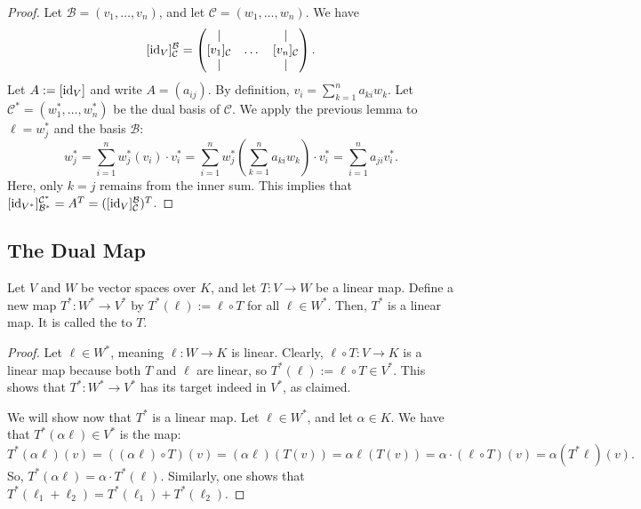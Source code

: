 \begin{proof}
  Let $\mathcal{B} = (v_1, \dots, v_n)$, and let $\mathcal{C} = (w_1, \dots, w_n)$. We have 
  \[[\operatorname{id}_V]_{\mathcal{C}}^{\mathcal{B}} = \begin{pmatrix} | & & | \\ [v_1]_{\mathcal{C}} & \dots & [v_n]_{\mathcal{C}} \\ | & & | \end{pmatrix}.\]
  Let $A := [\operatorname{id}_V]$ and write $A = (a_{ij})$. By definition, $v_i = \sum_{k=1}^n a_{ki} w_k$.
  Let $\mathcal{C}^* = (w_1^*, \dots, w_n^*)$ be the dual basis of $\mathcal{C}$. We apply the previous lemma to $\ell = w_j^*$ and the basis $\mathcal{B}$:
  \[ w_j^* = \sum_{i=1}^n w_j^*(v_i) \cdot v_i^* = \sum_{i=1}^n w_j^*\left(\sum_{k=1}^n a_{ki} w_k\right) \cdot v_i^* = \sum_{i=1}^n a_{ji} v_i^*. \]
  Here, only $k = j$ remains from the inner sum. This implies that $[\operatorname{id}_{V^*}]_{\mathcal{B}^*}^{\mathcal{C}^*} = A^T = ([\operatorname{id}_V]_{\mathcal{C}}^{\mathcal{B}})^T$.
\end{proof}

\subsection{The Dual Map}
\begin{lemma}
  Let $V$ and $W$ be vector spaces over $K$, and let $T \colon V \to W$ be a linear map. Define a new map $T^* \colon W^* \to V^*$ by $T^*(\ell) := \ell \circ T$ for all $\ell \in W^*$. Then, $T^*$ is a linear map. It is called the  to $T$.
\end{lemma}

\begin{proof}
  Let $\ell \in W^*$, meaning $\ell \colon W \to K$ is linear. Clearly, $\ell \circ T \colon V \to K$ is a linear map because both $T$ and $\ell$ are linear, so $T^*(\ell) := \ell \circ T \in V^*$. This shows that $T^* \colon W^* \to V^*$ has its target indeed in $V^*$, as claimed.

  We will show now that $T^*$ is a linear map. Let $\ell \in W^*$, and let $\alpha \in K$. We have that $T^*(\alpha \ell) \in V^*$ is the map:
  $$T^*(\alpha \ell)(v) = ((\alpha \ell) \circ T)(v) = (\alpha \ell)(T(v)) = \alpha \ell(T(v)) = \alpha \cdot (\ell \circ T)(v) = \alpha (T^* \ell)(v).$$
  So, $T^*(\alpha \ell) = \alpha \cdot T^*(\ell)$. Similarly, one shows that $T^*(\ell_1 + \ell_2) = T^*(\ell_1) + T^*(\ell_2)$.
\end{proof}

